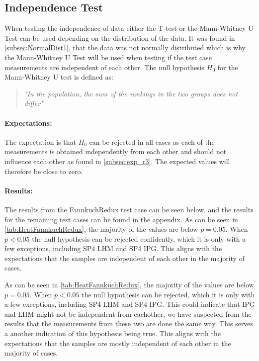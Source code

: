 

\subsection{Independence Test}\label{subsec:independence1}

When testing the independence of data either the T-test or the Mann-Whitney U Test can be used depending on the distribution of the data. It was found in \cref{subsec:NormalDist1}, that the data was not normally distributed which is why the Mann-Whitney U Test will be used when testing if the test case measurements are independent of each other. The null hypothesis $H_0$ for the Mann-Whitney U test is defined as:

\begin{quote}
    \textit{"In the population, the sum of the rankings in the two groups does not differ"}\cite*[]{mann1947test}
\end{quote}

\paragraph{Expectations:} The expectation is that $H_0$ can be rejected in all cases as each of the measurements is obtained independently from each other and should not influence each other as found in \cref{subsec:exp_r3}. The expected values will therefore be close to zero.

\paragraph{Results:}
The results from the FannkuchRedux test case can be seen below, and the results for the remaining test cases can be found in the appendix. As can be seen in \cref{tab:HeatFannkuchRedux}, the majority of the values are below $p = 0.05$. When $p < 0.05$ the null hypothesis can be rejected confidently, which it is only with a few exceptions, including SP4 LHM and SP4 IPG. This aligns with the expectations that the samples are independent of each other in the majority of cases.

 

As can be seen in \cref{tab:HeatFannkuchRedux}, the majority of the values are below $p = 0.05$. When $p < 0.05$ the null hypothesis can be rejected, which it is only with a few exceptions, including SP4 LHM and SP4 IPG. This could indicate that IPG and LHM might not be independent from eachother, we have suspected from the results that the measurements from these two are done the same way. This serves a another indication of this hypothesis being true.
This aligns with the expectations that the samples are mostly independent of each other in the majority of cases.

